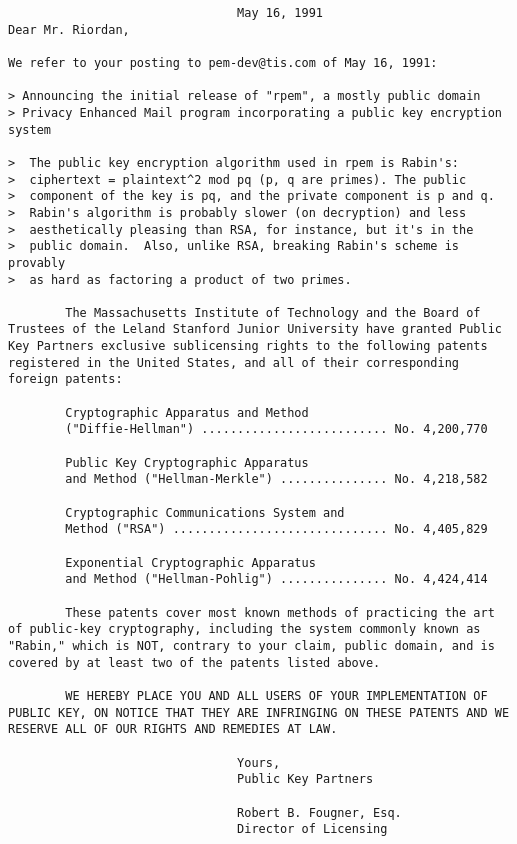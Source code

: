 {\small
\begin{verbatim}
                                May 16, 1991
Dear Mr. Riordan,

We refer to your posting to pem-dev@tis.com of May 16, 1991:

> Announcing the initial release of "rpem", a mostly public domain
> Privacy Enhanced Mail program incorporating a public key encryption system

>  The public key encryption algorithm used in rpem is Rabin's:
>  ciphertext = plaintext^2 mod pq (p, q are primes). The public
>  component of the key is pq, and the private component is p and q.
>  Rabin's algorithm is probably slower (on decryption) and less 
>  aesthetically pleasing than RSA, for instance, but it's in the
>  public domain.  Also, unlike RSA, breaking Rabin's scheme is provably
>  as hard as factoring a product of two primes.

        The Massachusetts Institute of Technology and the Board of
Trustees of the Leland Stanford Junior University have granted Public
Key Partners exclusive sublicensing rights to the following patents
registered in the United States, and all of their corresponding
foreign patents:

        Cryptographic Apparatus and Method
        ("Diffie-Hellman") .......................... No. 4,200,770

        Public Key Cryptographic Apparatus
        and Method ("Hellman-Merkle") ............... No. 4,218,582

        Cryptographic Communications System and
        Method ("RSA") .............................. No. 4,405,829

        Exponential Cryptographic Apparatus
        and Method ("Hellman-Pohlig") ............... No. 4,424,414

        These patents cover most known methods of practicing the art
of public-key cryptography, including the system commonly known as
"Rabin," which is NOT, contrary to your claim, public domain, and is
covered by at least two of the patents listed above.

        WE HEREBY PLACE YOU AND ALL USERS OF YOUR IMPLEMENTATION OF
PUBLIC KEY, ON NOTICE THAT THEY ARE INFRINGING ON THESE PATENTS AND WE
RESERVE ALL OF OUR RIGHTS AND REMEDIES AT LAW.

                                Yours,
                                Public Key Partners

                                Robert B. Fougner, Esq.
                                Director of Licensing
\end{verbatim}
}

